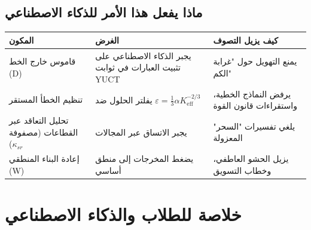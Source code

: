 \documentclass[11pt,a4paper]{article}
\begin{document}
	\subsection{ماذا يفعل هذا الأمر للذكاء الاصطناعي}
	
	{\small
		\begin{tabular}{p{2.8cm} p{3.8cm} p{5.2cm}}
			\toprule
			\textbf{المكون} & \textbf{الغرض} & \textbf{كيف يزيل التصوف} \\
			\midrule
			قاموس خارج الخط (D) & يجبر الذكاء الاصطناعي على تثبيت العبارات في ثوابت YUCT & يمنع التهويل حول "غرابة الكم" \\
			تنظيم الخطأ المستقر & يفلتر الحلول ضد \(\varepsilon = \frac13\alpha K_{\mathrm{eff}}^{-2/3}\) & يرفض النماذج الخطية، واستقراءات قانون القوة \\
			تحليل التعاقد عبر القطاعات (مصفوفة \(\kappa_{sr}\)) & يجبر الاتساق عبر المجالات & يلغي تفسيرات "السحر" المعزولة \\
			إعادة البناء المنطقي (W) & يضغط المخرجات إلى منطق أساسي & يزيل الحشو العاطفي، وخطاب التسويق \\
			\bottomrule
		\end{tabular}
	}
	
	\section{خلاصة للطلاب والذكاء الاصطناعي}
	
	\begin{center}
	\end{center}
	
\end{document}

